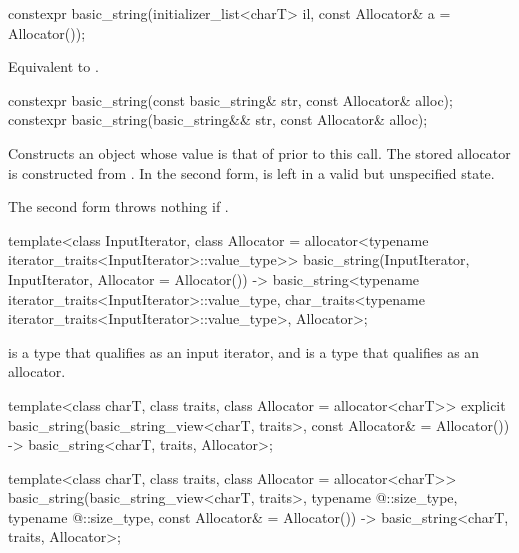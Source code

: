 %
\begin{itemdecl}
constexpr basic_string(initializer_list<charT> il, const Allocator& a = Allocator());
\end{itemdecl}

\begin{itemdescr}
\pnum
\effects
Equivalent to .
\end{itemdescr}

%
\begin{itemdecl}
constexpr basic_string(const basic_string& str, const Allocator& alloc);
constexpr basic_string(basic_string&& str, const Allocator& alloc);
\end{itemdecl}

\begin{itemdescr}
\pnum
\effects
Constructs an object whose value is
that of  prior to this call.
The stored allocator is constructed from .
In the second form,  is left in a valid but unspecified state.

\pnum
\throws
The second form throws nothing if .
\end{itemdescr}

\begin{itemdecl}
template<class InputIterator,
         class Allocator = allocator<typename iterator_traits<InputIterator>::value_type>>
  basic_string(InputIterator, InputIterator, Allocator = Allocator())
    -> basic_string<typename iterator_traits<InputIterator>::value_type,
                    char_traits<typename iterator_traits<InputIterator>::value_type>,
                    Allocator>;
\end{itemdecl}

\begin{itemdescr}
\pnum
\constraints
{} is a type that qualifies as an input iterator,
and  is a type that qualifies as an allocator.
\end{itemdescr}

\begin{itemdecl}
template<class charT,
         class traits,
         class Allocator = allocator<charT>>
  explicit basic_string(basic_string_view<charT, traits>, const Allocator& = Allocator())
    -> basic_string<charT, traits, Allocator>;

template<class charT,
         class traits,
         class Allocator = allocator<charT>>
  basic_string(basic_string_view<charT, traits>,
               typename @\seebelow@::size_type, typename @\seebelow@::size_type,
               const Allocator& = Allocator())
    -> basic_string<charT, traits, Allocator>;
\end{itemdecl}

